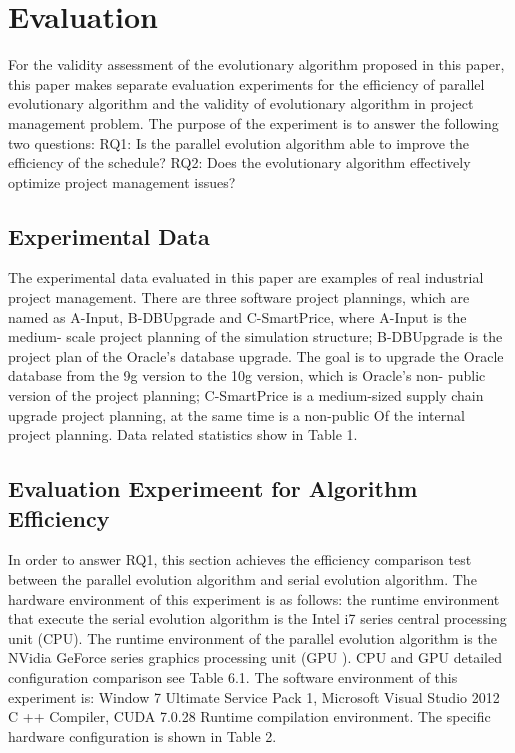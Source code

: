 \section{Evaluation}
%
For the validity assessment of the evolutionary algorithm proposed in this 
paper, this paper makes separate evaluation experiments for the efficiency of 
parallel evolutionary algorithm and the validity of evolutionary algorithm in 
project management problem. The purpose of the experiment is to answer the 
following two questions:
RQ1: Is the parallel evolution algorithm able to improve the efficiency of 
the schedule?
RQ2: Does the evolutionary algorithm effectively optimize project management 
issues?

\subsection{Experimental Data}
%
The experimental data evaluated in this paper are examples of real industrial 
project management. There are three software project plannings, which are 
named as A-Input, B-DBUpgrade and C-SmartPrice, where A-Input is the medium-
scale project planning of the simulation structure; B-DBUpgrade is the 
project plan of the Oracle’s database upgrade. The goal is to upgrade the 
Oracle database from the 9g version to the 10g version, which is Oracle's non-
public version of the project planning; C-SmartPrice is a medium-sized supply 
chain upgrade project planning, at the same time is a non-public Of the 
internal project planning\cite{ren}. Data related statistics show in Table 1.

\subsection{Evaluation Experimeent for Algorithm Efficiency}
%
In order to answer RQ1, this section achieves the efficiency comparison test 
between the parallel evolution algorithm and serial evolution algorithm. The 
hardware environment of this experiment is as follows: the runtime 
environment that execute the serial evolution algorithm is the Intel i7 
series central processing unit (CPU). The runtime environment of the parallel 
evolution algorithm is the NVidia GeForce series graphics processing unit (GPU
). CPU and GPU detailed configuration comparison see Table 6.1. The software 
environment of this experiment is: Window 7 Ultimate Service Pack 1, 
Microsoft Visual Studio 2012 C ++ Compiler, CUDA 7.0.28 Runtime compilation 
environment. The specific hardware configuration is shown in Table 2.

